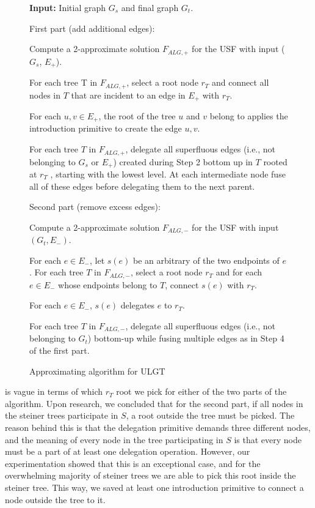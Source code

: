 \documentclass{article}
\begin{document}
\begin{figure}
  \textbf{Input:} Initial graph $G_s$ and final graph $G_t$.
  \vspace{1em}

  First part (add additional edges):
  \begin{compactenum}
  \item Compute a 2-approximate solution $F_{ALG,+}$ for the USF with input ($G_s$, $E_+$).
  \item For each tree T in $F_{ALG,+}$, select a root node $r_T$ and connect all nodes in $T$ that are incident to an edge in $E_+$ with $r_T$.
    \item For each ${u, v} \in E_+$, the root of the tree $u$ and $v$ belong to applies the introduction
  primitive to create the edge ${u, v}$.
  \item For each tree $T$ in $F_{ALG,+}$, delegate all superfluous edges (i.e., not belonging to $G_s$ or
  $E_+$) created during Step 2 bottom up in $T$ rooted at $r_T$ , starting with the lowest level.
  At each intermediate node fuse all of these edges before delegating them to the next
  parent.
  \end{compactenum}
  \vspace{1em}
  Second part (remove excess edges):
  \begin{compactenum}
  \item Compute a 2-approximate solution $F_{ALG,-}$ for the USF with input $(G_t, E_-)$.
    \item For each $e \in E_-$, let $s(e)$ be an arbitrary of the two endpoints of $e$. For each tree $T$
    in $F_{ALG,-}$, select a root node $r_T$ and for each $e \in E_-$ whose endpoints belong to $T$,
    connect $s(e)$ with $r_T$.
    \item For each $e \in E_-$, $s(e)$ delegates $e$ to $r_T$.
    \item For each tree $T$ in $F_{ALG,-}$, delegate all superfluous edges (i.e., not belonging to $G_t$)
  bottom-up while fusing multiple edges as in Step 4 of the first part.
  \end{compactenum}
  \caption{Approximating algorithm for ULGT}
  \label{fig:ulgt-algorithm}
\end{figure}

\cite{ulgt} is vague in terms of which $r_T$ root we pick for either of the two parts of the algorithm. Upon research, we concluded that for the second part, if all nodes in the steiner trees participate in $S$, a root outside the tree must be picked. The reason behind this is that the delegation primitive demands three different nodes, and the meaning of every node in the tree participating in $S$ is that every node must be a part of at least one delegation operation. However, our experimentation showed that this is an exceptional case, and for the overwhelming majority of steiner trees we are able to pick this root inside the steiner tree. This way, we saved at least one introduction primitive to connect a node outside the tree to it.
\end{document}
